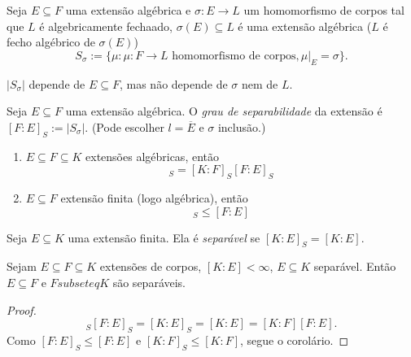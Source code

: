 \begin{definition}
	Seja $E \subseteq F$ uma extensão algébrica e $\sigma:E \to L$ um homomorfismo de corpos tal que $L$ é algebricamente fechaado, $\sigma(E) \subseteq L$ é uma extensão algébrica ($L$ é fecho algébrico de $\sigma(E)$)
	\begin{equation*}
	S_\sigma := \{\mu : \mu: F \to L \text{\ homomorfismo de corpos}, \mu|_E=\sigma\}.
	\end{equation*}
\end{definition}

\begin{lemma}
	$|S_\sigma|$ depende de $E \subseteq F$, mas não depende de $\sigma$ nem de $L$.
\end{lemma}

\begin{definition}
	Seja $E \subseteq F$ uma extensão algébrica. O \emph{grau de separabilidade} da extensão é $[F:E]_S := |S_\sigma|$. (Pode escolher $l=\overline{E}$ e $\sigma$ inclusão.)
\end{definition}

\begin{theorem}
	\begin{enumerate}
	\item $E \subseteq F \subseteq K$ extensões algébricas, então
		\begin{equation*}
		[K:E]_S = [K:F]_S[F:E]_S
		\end{equation*}
	\item $E \subseteq F$ extensão finita (logo algébrica), então
		\begin{equation*}
		[F:E]_S \leq [F:E]
		\end{equation*}
	\end{enumerate}
\end{theorem}

\begin{definition}
	Seja $E \subseteq K$ uma extensão finita. Ela é \emph{separável} se $[K:E]_S=[K:E]$.
\end{definition}

\begin{corollary}
	Sejam $E \subseteq F \subseteq K$ extensões de corpos, $[K:E] < \infty$, $E \subseteq K$ separável. Então $E \subseteq F$ e $F subseteq K$ são separáveis.
\end{corollary}
\begin{proof}
	\begin{equation*}
	[K:F]_S [F:E]_S = [K:E]_S = [K:E] = [K:F][F:E].
	\end{equation*}
	Como $[F:E]_S \leq [F:E]$ e $[K:F]_S \leq [K:F]$, segue o corolário.
\end{proof}



